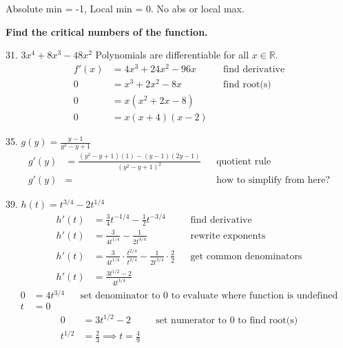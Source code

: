 \documentclass{article}
\begin{document}
\begin{description}
          Absolute min = -1, Local min = 0. No abs or local max.
    \item\textbf{Find the critical numbers of the function.}
          \begin{description}
              \setlength\itemsep{3em}
              \item 31. $3x^4 + 8x^3-48x^2$
                    Polynomials are differentiable for all  $x \in \mathbb{R}$.
                    \begin{align*}
                        f'(x) & = 4x^3 + 24x^2-96x &  & \text{find derivative} \\
                        0     & = x^3 + 2x^2 - 8x  &  & \text{find root(s)}    \\
                        0     & = x(x^2 +2x - 8)                               \\
                        0     & = x(x + 4)(x-2)
                    \end{align*}
              \item 35. $g(y) = \frac{y-1}{y^2 - y + 1}$
                    \begin{align*}
                        g'(y) & = \frac{(y^2 - y + 1)(1) - (y-1)(2y-1)}{{(y^2 - y + 1)}^2} &  & \text{quotient rule} \\ g'(y) &= && \text{how to simplify from here?}
                    \end{align*}
              \item 39. $h(t) = t^{3/4} - 2t^{1/4}$
                    \begin{align*}
                        h'(t) & = \frac{3}{4}t^{-1/4} - \frac{1}{2}t^{-3/4}                                               &  & \text{find derivative}         \\[1em]
                        h'(t) & = \frac{3}{4t^{1/4}} - \frac{1}{2t^{3/4}}                                                 &  & \text{rewrite exponents}       \\[1em]
                        h'(t) & = \frac{3}{4t^{1/4}} \cdot \frac{t^{2/4}}{t^{2/4}} - \frac{1}{2t^{3/4}} \cdot \frac{2}{2} &  & \text{get common denominators} \\[1em]
                        h'(t) & = \frac{3t^{1/2} - 2}{4t^{3/4}}
                    \end{align*}
                    \begin{align*}
                        0 & = 4t^{3/4} &  & \text{set denominator to 0 to evaluate where function is undefined} \\
                        t & = 0
                    \end{align*}
                    \begin{align*}
                        0       & = 3t^{1/2} - 2                          &  & \text{set numerator to 0 to find root(s)} \\[1em]
                        t^{1/2} & = \frac{2}{3} \implies  t = \frac{4}{9}
                    \end{align*}


\end{description}
\end{description}
\end{document}
